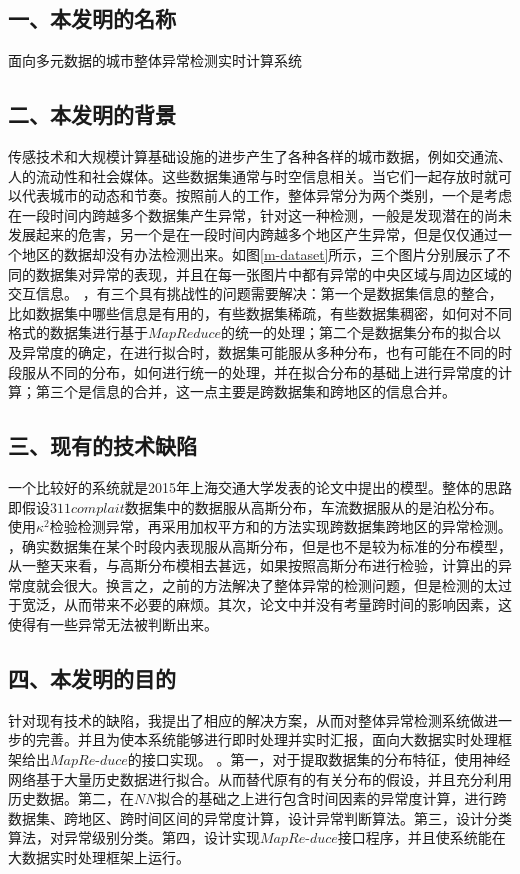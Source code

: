 \documentclass[a4paper, UTF8]{article}
\begin{document}
\begin{CJK}{UTF8}{gbsn}
\begin{appendix}
\subsection*{一、本发明的名称}
面向多元数据的城市整体异常检测实时计算系统
\subsection*{二、本发明的背景}
传感技术和大规模计算基础设施的进步产生了各种各样的城市数据，例如交通流、人的流动性和社会媒体。这些数据集通常与时空信息相关。当它们一起存放时就可以代表城市的动态和节奏。按照前人的工作，整体异常分为两个类别，一个是考虑在一段时间内跨越多个数据集产生异常，针对这一种检测，一般是发现潜在的尚未发展起来的危害，另一个是在一段时间内跨越多个地区产生异常，但是仅仅通过一个地区的数据却没有办法检测出来。如图\ref{m-dataset}所示，三个图片分别展示了不同的数据集对异常的表现，并且在每一张图片中都有异常的中央区域与周边区域的交互信息。
，有三个具有挑战性的问题需要解决：第一个是数据集信息的整合，比如数据集中哪些信息是有用的，有些数据集稀疏，有些数据集稠密，如何对不同格式的数据集进行基于$MapReduce$的统一的处理；第二个是数据集分布的拟合以及异常度的确定，在进行拟合时，数据集可能服从多种分布，也有可能在不同的时段服从不同的分布，如何进行统一的处理，并在拟合分布的基础上进行异常度的计算；第三个是信息的合并，这一点主要是跨数据集和跨地区的信息合并。
\subsection*{三、现有的技术缺陷}
一个比较好的系统就是2015年上海交通大学发表的论文中提出的模型。整体的思路即假设$311 complait$数据集中的数据服从高斯分布，车流数据服从的是泊松分布。使用$\kappa ^ 2$检验检测异常，再采用加权平方和的方法实现跨数据集跨地区的异常检测。
，确实数据集在某个时段内表现服从高斯分布，但是也不是较为标准的分布模型，从一整天来看，与高斯分布模相去甚远，如果按照高斯分布进行检验，计算出的异常度就会很大。换言之，之前的方法解决了整体异常的检测问题，但是检测的太过于宽泛，从而带来不必要的麻烦。其次，论文中并没有考量跨时间的影响因素，这使得有一些异常无法被判断出来。
\subsection*{四、本发明的目的}
针对现有技术的缺陷，我提出了相应的解决方案，从而对整体异常检测系统做进一步的完善。并且为使本系统能够进行即时处理并实时汇报，面向大数据实时处理框架给出$MapRe$-$duce$的接口实现。
。第一，对于提取数据集的分布特征，使用神经网络基于大量历史数据进行拟合。从而替代原有的有关分布的假设，并且充分利用历史数据。第二，在$NN$拟合的基础之上进行包含时间因素的异常度计算，进行跨数据集、跨地区、跨时间区间的异常度计算，设计异常判断算法。第三，设计分类算法，对异常级别分类。第四，设计实现$MapRe$-$duce$接口程序，并且使系统能在大数据实时处理框架上运行。

\end{appendix}
\end{CJK}
\end{document}
